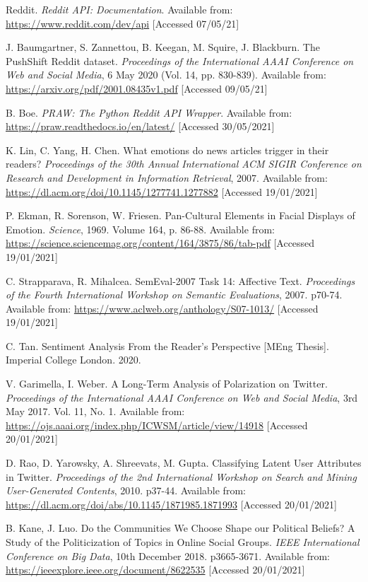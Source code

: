 \begin{thebibliography}{9}
Reddit. \textit{Reddit API: Documentation}. Available from: \url{https://www.reddit.com/dev/api} [Accessed 07/05/21]

J. Baumgartner, S. Zannettou, B. Keegan, M. Squire, J. Blackburn. The PushShift Reddit dataset. \textit{Proceedings of the International AAAI Conference on Web and Social Media}, 6 May 2020 (Vol. 14, pp. 830-839). Available from: \url{https://arxiv.org/pdf/2001.08435v1.pdf} [Accessed 09/05/21]

B. Boe. \textit{PRAW: The Python Reddit API Wrapper}. Available from: \url{https://praw.readthedocs.io/en/latest/} [Accessed 30/05/2021]

K. Lin, C. Yang, H. Chen. What emotions do news articles trigger in their readers? \textit{Proceedings of the 30th Annual International ACM SIGIR Conference on Research and Development in Information Retrieval}, 2007. Available from: \url{https://dl.acm.org/doi/10.1145/1277741.1277882} [Accessed 19/01/2021]

P. Ekman, R. Sorenson, W. Friesen. Pan-Cultural Elements in Facial Displays of Emotion. \textit{Science}, 1969. Volume 164, p. 86-88. Available from: \url{https://science.sciencemag.org/content/164/3875/86/tab-pdf} [Accessed 19/01/2021]

C. Strapparava, R. Mihalcea. SemEval-2007 Task 14: Affective Text. \textit{Proceedings of the Fourth International Workshop on Semantic Evaluations}, 2007. p70-74. Available from: \url{https://www.aclweb.org/anthology/S07-1013/} [Accessed 19/01/2021]

C. Tan. Sentiment Analysis From the Reader’s Perspective [MEng Thesis]. Imperial College London. 2020.

V. Garimella, I. Weber. A Long-Term Analysis of Polarization on Twitter. \textit{Proceedings of the International AAAI Conference on Web and Social Media}, 3rd May 2017. Vol. 11, No. 1. Available from: \url{https://ojs.aaai.org/index.php/ICWSM/article/view/14918} [Accessed 20/01/2021]

D. Rao, D. Yarowsky, A. Shreevats, M. Gupta. Classifying Latent User Attributes in Twitter. \textit{Proceedings of the 2nd International Workshop on Search and Mining User-Generated Contents}, 2010. p37-44. Available from: \url{https://dl.acm.org/doi/abs/10.1145/1871985.1871993} [Accessed 20/01/2021]

B. Kane, J. Luo. Do the Communities We Choose Shape our Political Beliefs? A Study of the Politicization of Topics in Online Social Groups. \textit{IEEE International Conference on Big Data}, 10th December 2018. p3665-3671. Available from: \url{https://ieeexplore.ieee.org/document/8622535} [Accessed 20/01/2021]


\end{thebibliography}
